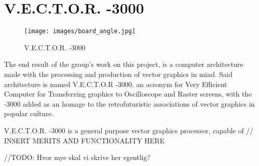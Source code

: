 \chapter{V.E.C.T.O.R. -3000}

\begin{figure}[H]
    \texttt{[image: images/board\_angle.jpg]}
    \caption{V.E.C.T.O.R. -3000}
    \label{fig:board-angle}
\end{figure}

The end result of the group's work on this project, is a computer architecture made with the processing and production of vector graphics in mind.
Said architecture is named V.E.C.T.O.R -3000, an acronym for Very Efficient Computer for Transferring graphics to Oscilloscope and Raster screens, with the -3000 added as an homage to the retrofuturistic associations of vector graphics in popular culture.

V.E.C.T.O.R. -3000 is a general purpose vector graphics processor, capable of // INSERT MERITS AND FUNCTIONALITY HERE

//TODO: Hvor mye skal vi skrive her egentlig?
